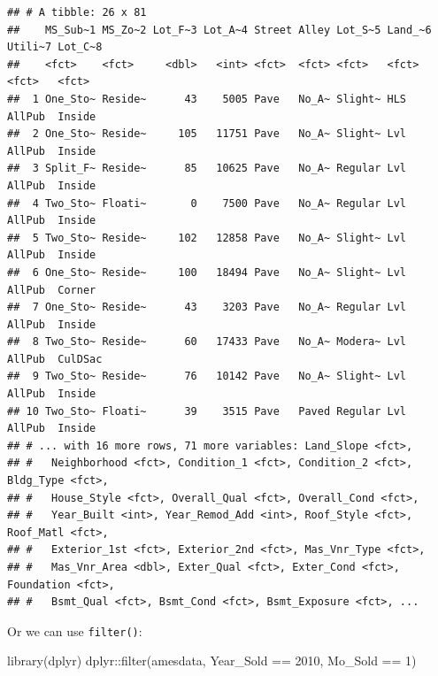 \documentclass[
]{book}
\newenvironment{Shaded}{\begin{snugshade}}{\end{snugshade}}
\newcommand{\DecValTok}[1]{\textcolor[rgb]{0.00,0.00,0.81}{#1}}
\newcommand{\FunctionTok}[1]{\textcolor[rgb]{0.00,0.00,0.00}{#1}}
\newcommand{\NormalTok}[1]{#1}
\newcommand{\SpecialCharTok}[1]{\textcolor[rgb]{0.00,0.00,0.00}{#1}}
\begin{document}
\begin{verbatim}
## # A tibble: 26 x 81
##    MS_Sub~1 MS_Zo~2 Lot_F~3 Lot_A~4 Street Alley Lot_S~5 Land_~6 Utili~7 Lot_C~8
##    <fct>    <fct>     <dbl>   <int> <fct>  <fct> <fct>   <fct>   <fct>   <fct>  
##  1 One_Sto~ Reside~      43    5005 Pave   No_A~ Slight~ HLS     AllPub  Inside 
##  2 One_Sto~ Reside~     105   11751 Pave   No_A~ Slight~ Lvl     AllPub  Inside 
##  3 Split_F~ Reside~      85   10625 Pave   No_A~ Regular Lvl     AllPub  Inside 
##  4 Two_Sto~ Floati~       0    7500 Pave   No_A~ Regular Lvl     AllPub  Inside 
##  5 Two_Sto~ Reside~     102   12858 Pave   No_A~ Slight~ Lvl     AllPub  Inside 
##  6 One_Sto~ Reside~     100   18494 Pave   No_A~ Slight~ Lvl     AllPub  Corner 
##  7 One_Sto~ Reside~      43    3203 Pave   No_A~ Regular Lvl     AllPub  Inside 
##  8 Two_Sto~ Reside~      60   17433 Pave   No_A~ Modera~ Lvl     AllPub  CulDSac
##  9 Two_Sto~ Reside~      76   10142 Pave   No_A~ Slight~ Lvl     AllPub  Inside 
## 10 Two_Sto~ Floati~      39    3515 Pave   Paved Regular Lvl     AllPub  Inside 
## # ... with 16 more rows, 71 more variables: Land_Slope <fct>,
## #   Neighborhood <fct>, Condition_1 <fct>, Condition_2 <fct>, Bldg_Type <fct>,
## #   House_Style <fct>, Overall_Qual <fct>, Overall_Cond <fct>,
## #   Year_Built <int>, Year_Remod_Add <int>, Roof_Style <fct>, Roof_Matl <fct>,
## #   Exterior_1st <fct>, Exterior_2nd <fct>, Mas_Vnr_Type <fct>,
## #   Mas_Vnr_Area <dbl>, Exter_Qual <fct>, Exter_Cond <fct>, Foundation <fct>,
## #   Bsmt_Qual <fct>, Bsmt_Cond <fct>, Bsmt_Exposure <fct>, ...
\end{verbatim}

Or we can use \texttt{filter()}:

\begin{Shaded}
\begin{Highlighting}[]
\FunctionTok{library}\NormalTok{(dplyr)}
\NormalTok{dplyr}\SpecialCharTok{::}\FunctionTok{filter}\NormalTok{(amesdata, Year\_Sold }\SpecialCharTok{==} \DecValTok{2010}\NormalTok{, Mo\_Sold }\SpecialCharTok{==} \DecValTok{1}\NormalTok{)}
\end{Highlighting}
\end{Shaded}
\end{document}
